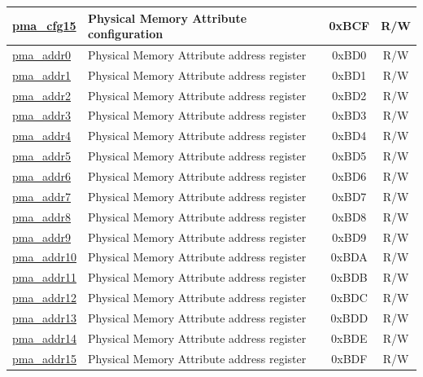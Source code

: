 \begin{longtable}{ | p{4.0cm} | p{8.4cm} | c | c| }
\hyperref[sec:riscvcpu-pma-reg-desc]{pma\_cfg15} & Physical Memory Attribute configuration & 0xBCF & R/W \\\hline
\hyperref[sec:riscvcpu-pma-reg-desc]{pma\_addr0} & Physical Memory Attribute address register & 0xBD0 & R/W \\\hline
\hyperref[sec:riscvcpu-pma-reg-desc]{pma\_addr1} & Physical Memory Attribute address register & 0xBD1 & R/W \\\hline
\hyperref[sec:riscvcpu-pma-reg-desc]{pma\_addr2} & Physical Memory Attribute address register & 0xBD2 & R/W \\\hline
\hyperref[sec:riscvcpu-pma-reg-desc]{pma\_addr3} & Physical Memory Attribute address register & 0xBD3 & R/W \\\hline
\hyperref[sec:riscvcpu-pma-reg-desc]{pma\_addr4} & Physical Memory Attribute address register & 0xBD4 & R/W \\\hline
\hyperref[sec:riscvcpu-pma-reg-desc]{pma\_addr5} & Physical Memory Attribute address register & 0xBD5 & R/W \\\hline
\hyperref[sec:riscvcpu-pma-reg-desc]{pma\_addr6} & Physical Memory Attribute address register & 0xBD6 & R/W \\\hline
\hyperref[sec:riscvcpu-pma-reg-desc]{pma\_addr7} & Physical Memory Attribute address register & 0xBD7 & R/W \\\hline
\hyperref[sec:riscvcpu-pma-reg-desc]{pma\_addr8} & Physical Memory Attribute address register & 0xBD8 & R/W \\\hline
\hyperref[sec:riscvcpu-pma-reg-desc]{pma\_addr9} & Physical Memory Attribute address register & 0xBD9 & R/W \\\hline
\hyperref[sec:riscvcpu-pma-reg-desc]{pma\_addr10} & Physical Memory Attribute address register & 0xBDA & R/W \\\hline
\hyperref[sec:riscvcpu-pma-reg-desc]{pma\_addr11} & Physical Memory Attribute address register & 0xBDB & R/W \\\hline
\hyperref[sec:riscvcpu-pma-reg-desc]{pma\_addr12} & Physical Memory Attribute address register & 0xBDC & R/W \\\hline
\hyperref[sec:riscvcpu-pma-reg-desc]{pma\_addr13} & Physical Memory Attribute address register & 0xBDD & R/W \\\hline
\hyperref[sec:riscvcpu-pma-reg-desc]{pma\_addr14} & Physical Memory Attribute address register & 0xBDE & R/W \\\hline
\hyperref[sec:riscvcpu-pma-reg-desc]{pma\_addr15} & Physical Memory Attribute address register & 0xBDF & R/W \\\hline

\end{longtable}
